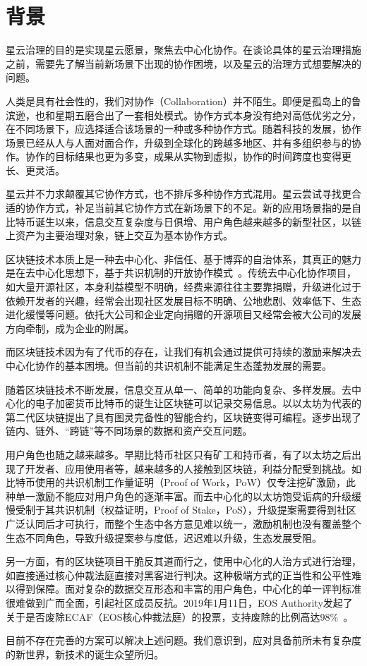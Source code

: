 \section{背景}

星云治理的目的是实现星云愿景，聚焦去中心化协作。在谈论具体的星云治理措施之前，需要先了解当前新场景下出现的协作困境，以及星云的治理方式想要解决的问题。

人类是具有社会性的，我们对协作（Collaboration）并不陌生。即便是孤岛上的鲁滨逊，也和星期五磨合出了一套相处模式。协作方式本身没有绝对高低优劣之分，在不同场景下，应选择适合该场景的一种或多种协作方式。随着科技的发展，协作场景已经从人与人面对面合作，升级到全球化的跨越多地区、并有多组织参与的协作。协作的目标结果也更为多变，成果从实物到虚拟，协作的时间跨度也变得更长、更灵活。

星云并不力求颠覆其它协作方式，也不排斥多种协作方式混用。星云尝试寻找更合适的协作方式，补足当前其它协作方式在新场景下的不足。新的应用场景指的是自比特币诞生以来，信息交互复杂度与日俱增、用户角色越来越多的新型社区，以链上资产为主要治理对象，链上交互为基本协作方式。

区块链技术本质上是⼀种去中心化、⾮信任、基于博弈的⾃治体系，其真正的魅力是在去中⼼化思想下，基于共识机制的开放协作模式~\cite{whitepaper}。传统去中心化协作项目，如大量开源社区，本身利益模型不明确，经费来源往往主要靠捐赠，升级进化过于依赖开发者的兴趣，经常会出现社区发展目标不明确、公地悲剧、效率低下、生态进化缓慢等问题。依托大公司和企业定向捐赠的开源项目又经常会被大公司的发展方向牵制，成为企业的附属。

而区块链技术因为有了代币的存在，让我们有机会通过提供可持续的激励来解决去中心化协作的基本困境。但当前的共识机制不能满足生态蓬勃发展的需要。

随着区块链技术不断发展，信息交互从单⼀、简单的功能向复杂、多样发展。去中心化的电子加密货币比特币的诞生让区块链可以记录交易信息。以以太坊为代表的第二代区块链提出了具有图灵完备性的智能合约，区块链变得可编程。逐步出现了链内、链外、“跨链”等不同场景的数据和资产交互问题。

用户角色也随之越来越多。早期比特币社区只有矿工和持币者，有了以太坊之后出现了开发者、应用使用者等，越来越多的人接触到区块链，利益分配受到挑战。如比特币使用的共识机制工作量证明（Proof of Work，PoW）仅专注挖矿激励，此种单一激励不能应对用户角色的逐渐丰富。而去中心化的以太坊饱受诟病的升级缓慢受制于其共识机制（权益证明，Proof of Stake，PoS），升级提案需要得到社区广泛认同后才可执行，而整个生态中各方意见难以统一，激励机制也没有覆盖整个生态不同角色，导致升级提案参与度低，迟迟难以升级，生态发展受阻。

另一方面，有的区块链项目干脆反其道而行之，使用中心化的人治方式进行治理，如直接通过核心仲裁法庭直接对黑客进行判决。这种极端方式的正当性和公平性难以得到保障。面对复杂的数据交互形态和丰富的用户角色，中心化的单一评判标准很难做到广而全面，引起社区成员反抗。2019年1月11日，EOS Authority发起了关于是否废除ECAF（EOS核心仲裁法庭）的投票，支持废除的比例高达98\%~\cite{DeleteECAF}。

目前不存在完善的方案可以解决上述问题。我们意识到，应对具备前所未有复杂度的新世界，新技术的诞生众望所归。

